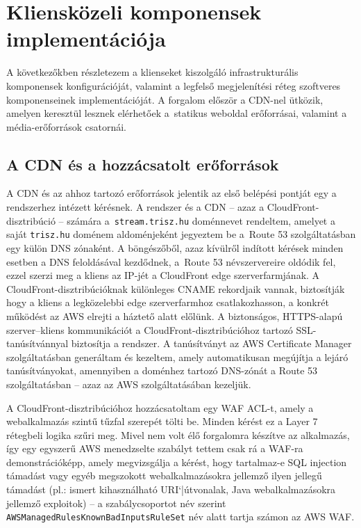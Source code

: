 \chapter{Kliensközeli komponensek implementációja}

A következőkben részletezem a klienseket kiszolgáló infrastrukturális komponensek konfigurációját, valamint a legfelső megjelenítési réteg szoftveres komponenseinek implementációját. A forgalom először a CDN-nel ütközik, amelyen keresztül lesznek elérhetőek a~statikus weboldal erőforrásai, valamint a média-erőforrások csatornái.

\section{A CDN és a hozzácsatolt erőforrások}

A CDN és az ahhoz tartozó erőforrások jelentik az első belépési pontját egy a rendszerhez intézett kérésnek. A rendszer és a CDN -- azaz a CloudFront-disztribúció -- számára a~\verb|stream.trisz.hu| doménnevet rendeltem, amelyet a saját \verb|trisz.hu| doménem aldoménjeként jegyeztem be a~Route 53 szolgáltatásban egy külön DNS zónaként. A böngészőből, azaz kívülről indított kérések minden esetben a DNS feloldásával kezdődnek, a~Route 53 névszervereire oldódik fel, ezzel szerzi meg a kliens az IP-jét a CloudFront edge szerverfarmjának. A CloudFront-disztribúcióknak különleges CNAME rekordjaik vannak, biztosítják hogy a kliens a legközelebbi edge szerverfarmhoz csatlakozhasson, a konkrét működést az AWS elrejti a háztető alatt előlünk. A biztonságos, HTTPS-alapú szerver--kliens kommunikációt a CloudFront-disztribúcióhoz tartozó SSL-tanúsítvánnyal biztosítja a rendszer. A tanúsítványt az AWS Certificate Manager szolgáltatásban generáltam és kezeltem, amely automatikusan megújítja a lejáró tanúsítványokat, amennyiben a doménhez tartozó DNS-zónát a Route 53 szolgáltatásban -- azaz az AWS szolgáltatásában kezeljük.

A CloudFront-disztribúcióhoz hozzácsatoltam egy WAF ACL-t, amely a webalkalmazás szintű tűzfal szerepét tölti be. Minden kérést ez a Layer 7 rétegbeli logika szűri meg. Mivel nem volt élő forgalomra készítve az alkalmazás, így egy egyszerű AWS menedzselte szabályt tettem csak rá a WAF-ra demonstrációképp, amely megvizsgálja a kérést, hogy tartalmaz-e SQL injection támadást vagy egyéb megszokott webalkalmazásokra jellemző ilyen jellegű támadást (pl.: ismert kihasználható URI`|útvonalak, Java webalkalmazásokra jellemző exploitok) -- a szabálycsoportot név szerint \verb|AWSManagedRulesKnownBadInputsRuleSet| név alatt tartja számon az AWS WAF.

